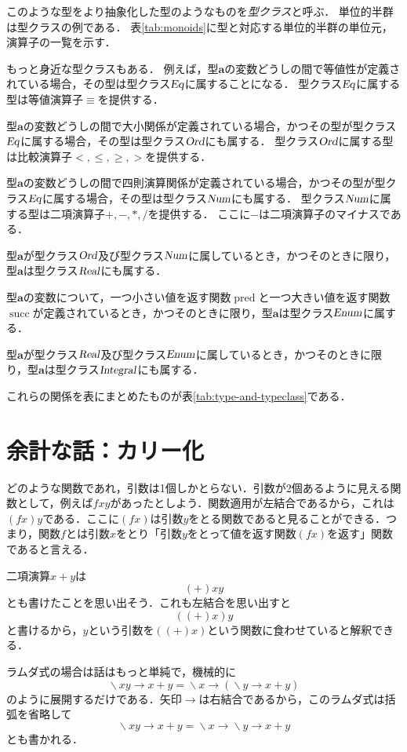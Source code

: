 \documentclass[twocolumn]{jsbook}
\newcommand{\keyword}[1]{{\emph{#1}}}
\newcommand{\hsklType}[1]{\textbf{#1}}
\newcommand{\hsklTypeclass}[1]{\textsl{#1}}
\DeclareMathOperator{\hsklPred}{pred}
\DeclareMathOperator{\hsklSucc}{succ}
\newcommand{\hsklEnum}{\hsklTypeclass{Enum}}
\newcommand{\hsklIntegral}{\hsklTypeclass{Integral}}
\newcommand{\hsklEq}{\hsklTypeclass{Eq}}
\newcommand{\hsklNum}{\hsklTypeclass{Num}}
\newcommand{\hsklOrd}{\hsklTypeclass{Ord}}
\newcommand{\hsklReal}{\hsklTypeclass{Real}}
\DeclareMathOperator{\mathLambda}{\backslash}
\newcommand{\mathLambdaArrow}{\rightarrow}
\newcommand{\mathLambdaExpression}[2]{\mathLambda#1\mathLambdaArrow#2}
\begin{document}
このような型をより抽象化した型のようなものを\keyword{型クラス}と呼ぶ．
単位的半群は型クラスの例である．
表\ref{tab:monoids}に型と対応する単位的半群の単位元，演算子の一覧を示す．

もっと身近な型クラスもある．
例えば，型$\hsklType{a}$の変数どうしの間で等値性が定義されている場合，その型は型クラス$\hsklEq$に属することになる．
型クラス$\hsklEq$に属する型は等値演算子$\equiv$を提供する．

型$\hsklType{a}$の変数どうしの間で大小関係が定義されている場合，かつその型が型クラス$\hsklEq$に属する場合，その型は型クラス$\hsklOrd$にも属する．
型クラス$\hsklOrd$に属する型は比較演算子$<,\le,\ge,>$を提供する．

型$\hsklType{a}$の変数どうしの間で四則演算関係が定義されている場合，かつその型が型クラス$\hsklEq$に属する場合，その型は型クラス$\hsklNum$にも属する．
型クラス$\hsklNum$に属する型は二項演算子$+,-,*,/$を提供する．
ここに$-$は二項演算子のマイナスである．

型$\hsklType{a}$が型クラス$\hsklOrd$及び型クラス$\hsklNum$に属しているとき，かつそのときに限り，型$\hsklType{a}$は型クラス$\hsklReal$にも属する．

型$\hsklType{a}$の変数について，一つ小さい値を返す関数$\hsklPred$と一つ大きい値を返す関数$\hsklSucc$が定義されているとき，かつそのときに限り，型$\hsklType{a}$は型クラス$\hsklEnum$に属する．

型$\hsklType{a}$が型クラス$\hsklReal$及び型クラス$\hsklEnum$に属しているとき，かつそのときに限り，型$\hsklType{a}$は型クラス$\hsklIntegral$にも属する．

これらの関係を表にまとめたものが表\ref{tab:type-and-typeclass}である．

\section{余計な話：カリー化}

どのような関数であれ，引数は1個しかとらない．引数が2個あるように見える関数として，例えば$fxy$があったとしよう．関数適用が左結合であるから，これは$(fx)y$である．ここに$(fx)$は引数$y$をとる関数であると見ることができる．つまり，関数$f$とは引数$x$をとり「引数$y$をとって値を返す関数$(fx)$を返す」関数であると言える．

二項演算$x+y$は$$(+)xy$$とも書けたことを思い出そう．これも左結合を思い出すと$$((+)x)y$$と書けるから，$y$という引数を$((+)x)$という関数に食わせていると解釈できる．

ラムダ式の場合は話はもっと単純で，機械的に$$\mathLambdaExpression{xy}{x+y}=\mathLambdaExpression{x}{(\mathLambdaExpression{y}{x+y})}$$のように展開するだけである．矢印$\mathLambdaArrow$は右結合であるから，このラムダ式は括弧を省略して$$\mathLambdaExpression{xy}{x+y}=\mathLambdaExpression{x}{\mathLambdaExpression{y}{x+y}}$$とも書かれる．
\end{document}
